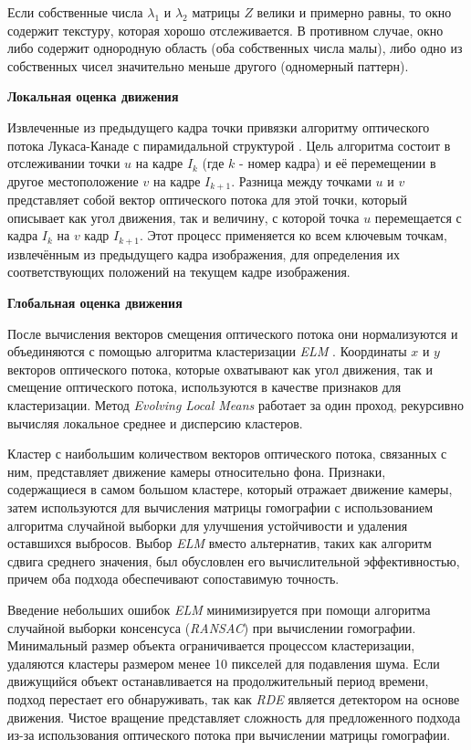 Если собственные числа \( \lambda_1 \) и \( \lambda_2 \) матрицы \( Z \) велики и примерно равны, то окно содержит текстуру, которая хорошо отслеживается. В противном случае, окно либо содержит однородную область (оба собственных числа малы), либо одно из собственных чисел значительно меньше другого (одномерный паттерн).

\textbf{Локальная оценка движения}

Извлеченные из предыдущего кадра точки привязки алгоритму оптического потока Лукаса-Канаде с пирамидальной структурой \cite{Bouguet1999PyramidalIO}. Цель алгоритма состоит в отслеживании точки \( u \) на кадре \( I_k \) (где \( k \) - номер кадра) и её перемещении в другое местоположение \( v \) на кадре \( I_{k+1} \). Разница между точками \( u \) и \( v \) представляет собой вектор оптического потока для этой точки, который описывает как угол движения, так и величину, с которой точка \( u \) перемещается с кадра \( I_k \) на \( v \) кадр \( I_{k+1} \). Этот процесс применяется ко всем ключевым точкам, извлечённым из предыдущего кадра изображения, для определения их соответствующих положений на текущем кадре изображения.

\textbf{Глобальная оценка движения}

После вычисления векторов смещения оптического потока они нормализуются и объединяются с помощью алгоритма кластеризации \textit{ELM} \cite{ELM}. Координаты \( x \) и \( y \) векторов оптического потока, которые охватывают как угол движения, так и смещение оптического потока, используются в качестве признаков для кластеризации. Метод \textit{Evolving Local Means} работает за один проход, рекурсивно вычисляя локальное среднее и дисперсию кластеров.

Кластер с наибольшим количеством векторов оптического потока, связанных с ним, представляет движение камеры относительно фона. Признаки, содержащиеся в самом большом кластере, который отражает движение камеры, затем используются для вычисления матрицы гомографии с использованием алгоритма случайной выборки для улучшения устойчивости и удаления оставшихся выбросов. Выбор \textit{ELM} вместо альтернатив, таких как алгоритм сдвига среднего значения, был обусловлен его вычислительной эффективностью, причем оба подхода обеспечивают сопоставимую точность. 

Введение небольших ошибок \textit{ELM} минимизируется при помощи алгоритма случайной выборки консенсуса (\textit{RANSAC}) при вычислении гомографии. Минимальный размер объекта ограничивается процессом кластеризации, удаляются кластеры размером менее 10 пикселей для подавления шума. Если движущийся объект останавливается на продолжительный период времени, подход перестает его обнаруживать, так как \textit{RDE} является детектором на основе движения. Чистое вращение представляет сложность для предложенного подхода из-за использования оптического потока при вычислении матрицы гомографии.

